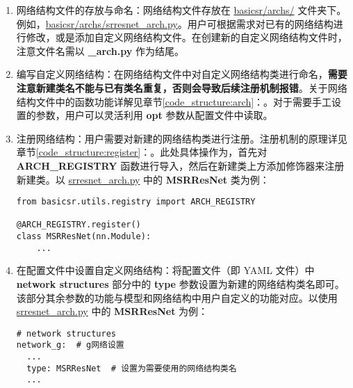 \documentclass[../main.tex]{subfiles}
\begin{document}
\begin{enumerate}[第 1 步]
    \item 网络结构文件的存放与命名：网络结构文件存放在 \href{https://github.com/XPixelGroup/BasicSR/tree/master/basicsr/archs}{basicsr/archs/} 文件夹下。例如，\href{https://github.com/XPixelGroup/BasicSR/tree/master/basicsr/archs}{basicsr/archs/srresnet\_arch.py}。用户可根据需求对已有的网络结构进行修改，或是添加自定义网络结构文件。在创建新的自定义网络结构文件时，注意文件名需以  \textbf{\_arch.py} 作为结尾。

    \item 编写自定义网络结构：在网络结构文件中对自定义网络结构类进行命名，\textbf{需要注意新建类名不能与已有类名重复，否则会导致后续注册机制报错}。关于网络结构文件中的函数功能详解见章节\ref{code_structure:arch}：。对于需要手工设置的参数，用户可以灵活利用 \textbf{opt} 参数从配置文件中读取。

    \item 注册网络结构：用户需要对新建的网络结构类进行注册。注册机制的原理详见章节\ref{code_structure:register}：。此处具体操作为，首先对 \textbf{ARCH\_REGISTRY} 函数进行导入，然后在新建类上方添加修饰器来注册新建类。以 \href{https://github.com/XPixelGroup/BasicSR/tree/master/basicsr/archs/srresnet_arch.py}{srresnet\_arch.py} 中的 \textbf{MSRResNet} 类为例：
          \begin{verbatim}
from basicsr.utils.registry import ARCH_REGISTRY

@ARCH_REGISTRY.register()
class MSRResNet(nn.Module):
    ...
\end{verbatim}

    \item 在配置文件中设置自定义网络结构：将配置文件（即 YAML 文件）中 \textbf{network structures} 部分中的 \textbf{type} 参数设置为新建的网络结构类名即可。
          该部分其余参数的功能与模型和网络结构中用户自定义的功能对应。以使用 \href{https://github.com/XPixelGroup/BasicSR/tree/master/basicsr/archs/srresnet_arch.py}{srresnet\_arch.py} 中的 \textbf{MSRResNet} 为例：

          \begin{verbatim}
# network structures
network_g:  # g网络设置
  ...
  type: MSRResNet  # 设置为需要使用的网络结构类名
  ...
\end{verbatim}
\end{enumerate}

\end{document}
